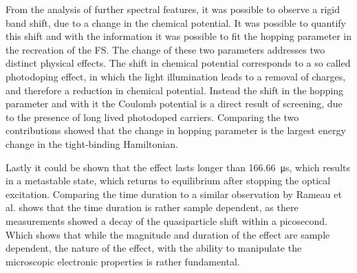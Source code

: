 From the analysis of further spectral features, it was possible to observe a rigid band shift, due to a change in the chemical potential.
It was possible to quantify this shift and with the information it was possible to fit the hopping parameter in the recreation of the FS.
The change of these two parameters addresses two distinct physical effects.
The shift in chemical potential corresponds to a so called photodoping effect, in which the light illumination leads to a removal of charges, and therefore a reduction in chemical potential.
Instead the shift in the hopping parameter and with it the Coulomb potential is a direct result of screening, due to the presence of long lived photodoped carriers.
Comparing the two contributions showed that the change in hopping parameter is the largest energy change in the tight-binding Hamiltonian.

Lastly it could be shown that the effect lasts longer than \qty{166.66}{\micro\second}, which results in a metastable state, which returns to equilibrium after stopping the optical excitation.
Comparing the time duration to a similar observation by Rameau et al. \cite{rameau_photoinduced_2014} shows that the time duration is rather sample dependent, as there measurements showed a decay of the quasiparticle shift within a picosecond.
Which shows that while the magnitude and duration of the effect are sample dependent, the nature of the effect, with the ability to manipulate the microscopic electronic properties is rather fundamental.

